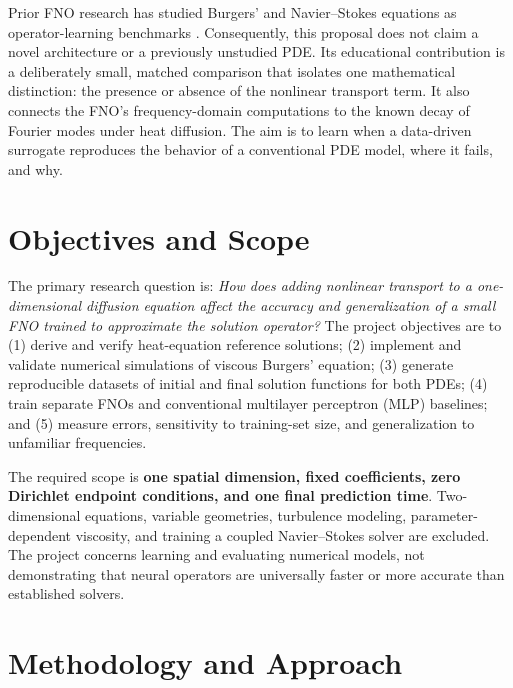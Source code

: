 \documentclass{article}
\begin{document}
Prior FNO research has studied Burgers' and Navier--Stokes equations as operator-learning benchmarks \citep{li2021fourier}. Consequently, this proposal does not claim a novel architecture or a previously unstudied PDE. Its educational contribution is a deliberately small, matched comparison that isolates one mathematical distinction: the presence or absence of the nonlinear transport term. It also connects the FNO's frequency-domain computations to the known decay of Fourier modes under heat diffusion. The aim is to learn when a data-driven surrogate reproduces the behavior of a conventional PDE model, where it fails, and why.

\section{Objectives and Scope}
The primary research question is: \emph{How does adding nonlinear transport to a one-dimensional diffusion equation affect the accuracy and generalization of a small FNO trained to approximate the solution operator?} The project objectives are to (1) derive and verify heat-equation reference solutions; (2) implement and validate numerical simulations of viscous Burgers' equation; (3) generate reproducible datasets of initial and final solution functions for both PDEs; (4) train separate FNOs and conventional multilayer perceptron (MLP) baselines; and (5) measure errors, sensitivity to training-set size, and generalization to unfamiliar frequencies.

The required scope is \textbf{one spatial dimension, fixed coefficients, zero Dirichlet endpoint conditions, and one final prediction time}. Two-dimensional equations, variable geometries, turbulence modeling, parameter-dependent viscosity, and training a coupled Navier--Stokes solver are excluded. The project concerns learning and evaluating numerical models, not demonstrating that neural operators are universally faster or more accurate than established solvers.

\section{Methodology and Approach}
\end{document}
